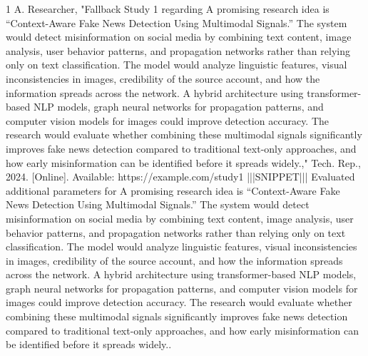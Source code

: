 \documentclass[conference]{IEEEtran}
\begin{document}
\begin{thebibliography}{1}
A. Researcher, "Fallback Study 1 regarding A promising research idea is “Context-Aware Fake News Detection Using Multimodal Signals.” The system would detect misinformation on social media by combining text content, image analysis, user behavior patterns, and propagation networks rather than relying only on text classification. The model would analyze linguistic features, visual inconsistencies in images, credibility of the source account, and how the information spreads across the network. A hybrid architecture using transformer-based NLP models, graph neural networks for propagation patterns, and computer vision models for images could improve detection accuracy. The research would evaluate whether combining these multimodal signals significantly improves fake news detection compared to traditional text-only approaches, and how early misinformation can be identified before it spreads widely.," Tech. Rep., 2024. [Online]. Available: https://example.com/study1 |||SNIPPET||| Evaluated additional parameters for A promising research idea is “Context-Aware Fake News Detection Using Multimodal Signals.” The system would detect misinformation on social media by combining text content, image analysis, user behavior patterns, and propagation networks rather than relying only on text classification. The model would analyze linguistic features, visual inconsistencies in images, credibility of the source account, and how the information spreads across the network. A hybrid architecture using transformer-based NLP models, graph neural networks for propagation patterns, and computer vision models for images could improve detection accuracy. The research would evaluate whether combining these multimodal signals significantly improves fake news detection compared to traditional text-only approaches, and how early misinformation can be identified before it spreads widely..

\end{thebibliography}
\end{document}
